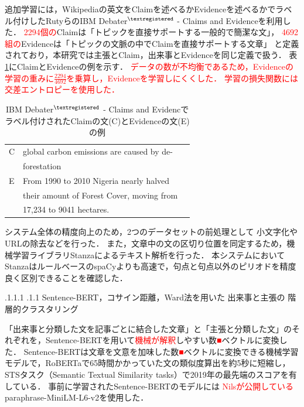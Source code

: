 \documentclass[a4paper, twocolumn, 10pt]{jarticle}
\makeatletter
\def\subsection{%
	\@startsection{subsection}{1}{\z@}%
	{.1\Cvs \@plus.1\Cdp \@minus.1\Cdp}%
	{.1\Cvs \@plus.1\Cdp}%
	{\normalfont\normalsize\bfseries}%
}
\makeatother
\begin{document}
追加学習には，Wikipediaの英文をClaimを述べるかEvidenceを述べるかでラベル付けしたRutyらのIBM Debater$^{\textregistered}$ - Claims and Evidenceを利用した\cite{rinott_show_2015}．
\textcolor{red}{2294個の}Claimは「トピックを直接サポートする一般的で簡潔な文」，
\textcolor{red}{4692組の}Evidenceは「トピックの文脈の中でClaimを直接サポートする文章」
と定義されており，本研究では主張とClaim，出来事とEvidenceを同じ定義で扱う．
表\ref{claim_evidence_example}にClaimとEvidenceの例を示す．
\textcolor{red}{
  データの数が不均衡であるため，Evidenceの学習の重みに$\frac{2294}{4692}$を乗算し，Evidenceを学習しにくくした．
  学習の損失関数には交差エントロピーを使用した．
}

\begin{table}[H]
  \caption{IBM Debater$^{\textregistered}$ - Claims and Evidencでラベル付けされたClaimの文(C)とEvidenceの文(E)の例}
  \centering
  \begin{tabular}{llp{6cm}}
    \hline
    C & global carbon emissions are caused by de-
    \\
    & forestation
    \\
    E & From 1990 to 2010 Nigeria nearly halved
    \\
    & their amount of Forest Cover, moving from
    \\
    & 17,234 to 9041 hectares.
    \\
    \hline
  \end{tabular}
  \label{claim_evidence_example}
\end{table}

システム全体の精度向上のため，2つのデータセットの前処理として
小文字化やURLの除去などを行った．
また，文章中の文の区切り位置を同定するため，機械学習ライブラリStanzaによるテキスト解析を行った\cite{qi_stanza_2020}．
本システムにおいてStanzaはルールベースのspaCyよりも高速で，句点と句点以外のピリオドを精度良く区別できることを確認した．



\subsection{
Sentence-BERT，コサイン距離，Ward法を用いた
出来事と主張の
階層的クラスタリング
}

「出来事と分類した文を記事ごとに結合した文章」と「主張と分類した文」のそれぞれを，Sentence-BERTを用いて\textcolor{red}{機械が解釈}しやすい数\textcolor{red}{■}ベクトルに変換した．
Sentence-BERTは文章を文意を加味した数\textcolor{red}{■}ベクトルに変換できる機械学習モデルで，RoBERTaで65時間かかっていた文の類似度算出を約5秒に短縮し，STSタスク（Semantic Textual Similarity tasks）で2019年の最先端のスコアを有している\cite{reimers_sentence-bert_2019}．
事前に学習されたSentence-BERTのモデルには
\textcolor{red}{Nilsが公開している}paraphrase-MiniLM-L6-v2を使用した．
\end{document}
